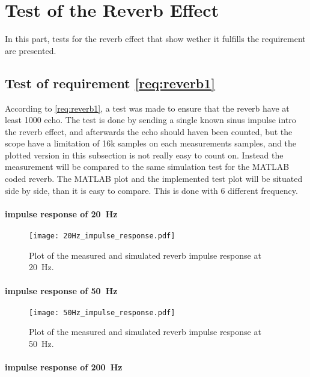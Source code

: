 \section{Test of the Reverb Effect}
In this part, tests for the reverb effect that show wether it fulfills the requirement are presented. 


\subsection{Test of requirement \autoref{req:reverb1}}
According to \autoref{req:reverb1}, a test was made to ensure that the \gls{reverb} have at least 1000 echo. The test is done by sending a single known sinus impulse intro the \gls{reverb} effect, and afterwards the echo should haven been counted, but the scope have a limitation of 16k samples on each measurements samples, and the plotted version in this subsection is not really easy to count on. Instead the measurement will be compared to the same simulation test for the MATLAB coded \gls{reverb}. The MATLAB plot and the implemented test plot will be situated side by side, than it is easy to compare. This is done with 6 different frequency. 

\paragraph{impulse response of \SI{20}{\hertz}}

\begin{figure}[!h]
    \centering
        \texttt{[image: 20Hz\_impulse\_response.pdf]}
        \caption{Plot of the measured and simulated \gls{reverb} impulse response at \SI{20}{\hertz}.}
        \label{fig:tests:reverb:20Hz}
  \end{figure}
  
\paragraph{impulse response of \SI{50}{\hertz}}

\begin{figure}[!h]
    \centering
        \texttt{[image: 50Hz\_impulse\_response.pdf]}
        \caption{Plot of the measured and simulated \gls{reverb} impulse response at \SI{50}{\hertz}.}
        \label{fig:tests:reverb:50Hz}
  \end{figure}

\paragraph{impulse response of \SI{200}{\hertz}}

